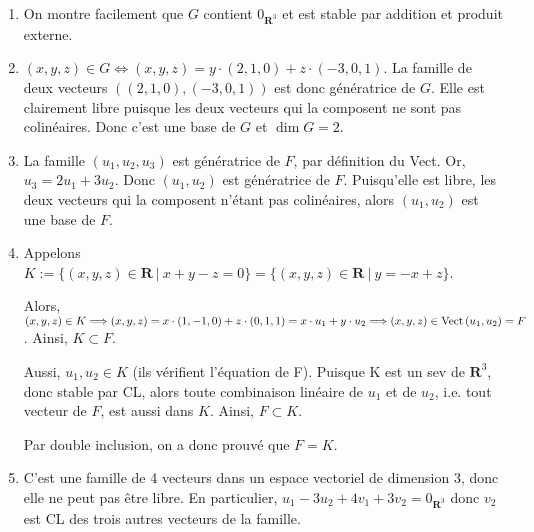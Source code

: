 \documentclass[12pt,a4paper]{article}
\renewcommand{\dim}{\mathop{\mathrm{dim}}\nolimits}
\def\Vect{{\rm Vect\,}}
\begin{document}
\begin{enumerate}
	\item On montre facilement que $G$ contient $0_{\mathbf{R}^3}$ et est stable par addition et produit externe.
	
	\vspace{0.5\baselineskip}
	
	\item $\displaystyle (x,y,z) \in G \Longleftrightarrow (x,y,z) = y \cdot (2,1,0) + z \cdot (-3,0,1)$. La famille de deux vecteurs $((2,1,0), (-3,0,1))$ est donc génératrice de $G$. Elle est clairement libre puisque les deux vecteurs qui la composent ne sont pas colinéaires. Donc c'est une base de $G$ et $\dim G = 2$.
	
	\vspace{0.5\baselineskip}
	
	\item La famille $(u_1,u_2,u_3)$ est génératrice de $F$, par définition du Vect. Or, $u_3 = 2u_1+3u_2$. Donc $(u_1,u_2)$ est génératrice de $F$. Puisqu'elle est libre, les deux vecteurs qui la composent n'étant pas colinéaires, alors $(u_1,u_2)$ est une base de $F$.
	
	\vspace{0.5\baselineskip}
	
	\item Appelons $K := \{ (x,y,z) \in \mathbf{R} \ | \ x+y-z=0\} = \{ (x,y,z) \in \mathbf{R} \ | \ y=-x+z\}$. 
	
	\vspace{0.25\baselineskip}
	
	Alors, $\displaystyle (x,y,z) \in K \Longrightarrow (x,y,z) = x \cdot (1,-1,0) + z \cdot (0,1,1) = x \cdot u_1 + y \cdot u_2 \Longrightarrow (x,y,z) \in \Vect(u_1,u_2) = F$. Ainsi, $K \subset F$. 
	
	\vspace{0.25\baselineskip}
	
	Aussi, $u_1, u_2 \in K$ (ils vérifient l'équation de F). Puisque K est un sev de $\mathbf{R}^3$, donc stable par CL, alors toute combinaison linéaire de $u_1$ et de $u_2$, i.e. tout vecteur de $F$, est aussi dans $K$. Ainsi, $F \subset K$. 
	
	\vspace{0.5\baselineskip}
	
	Par double inclusion, on a donc prouvé que $F = K$.
	
	\vspace{0.5\baselineskip}
	
	\item C'est une famille de 4 vecteurs dans un espace vectoriel de dimension 3, donc elle ne peut pas être libre. En particulier, $u_1-3u_2+4v_1+3v_2 = 0_{\mathbf{R}^3}$ donc $v_2$ est CL des trois autres vecteurs de la famille.
	

\end{enumerate}
\end{document}

